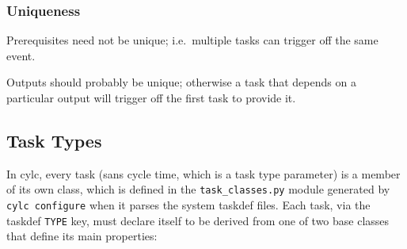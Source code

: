 \documentclass[11pt,a4paper]{article}
\begin{document}
\subsubsection{Uniqueness}

Prerequisites need not be unique; i.e.\ multiple tasks can trigger off
the same event.

Outputs should probably be unique; otherwise a task that depends on a
particular output will trigger off the first task to provide it.


\subsection{Task Types} 
\label{TaskTypes}

In cylc, every task (sans cycle time, which is a task type parameter) is
a member of its own class, which is defined in the \lstinline=task_classes.py=
module generated by \lstinline=cylc configure= when it parses the system
taskdef files.  Each task, via the taskdef \lstinline=TYPE= key, must
declare itself to be derived from one of two base classes that define
its main properties:
\end{document}
